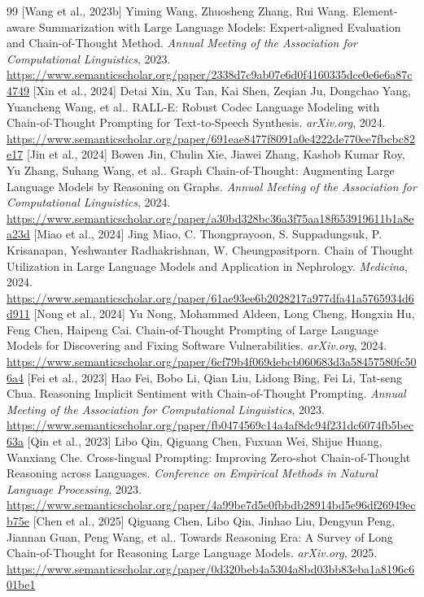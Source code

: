 \documentclass[11pt]{article}
\begin{document}
\begin{thebibliography}{99}
 [Wang et al., 2023b] Yiming Wang, Zhuosheng Zhang, Rui Wang. Element-aware Summarization with Large Language Models: Expert-aligned Evaluation and Chain-of-Thought Method. \emph{Annual Meeting of the Association for Computational Linguistics}, 2023. \url{https://www.semanticscholar.org/paper/2338d7c9ab07e6d0f4160335dce0e6e6a87c4749}
 [Xin et al., 2024] Detai Xin, Xu Tan, Kai Shen, Zeqian Ju, Dongchao Yang, Yuancheng Wang, et al.. RALL-E: Robust Codec Language Modeling with Chain-of-Thought Prompting for Text-to-Speech Synthesis. \emph{arXiv.org}, 2024. \url{https://www.semanticscholar.org/paper/691eae8477f8091a0e4222de770ee7fbcbc82e17}
 [Jin et al., 2024] Bowen Jin, Chulin Xie, Jiawei Zhang, Kashob Kumar Roy, Yu Zhang, Suhang Wang, et al.. Graph Chain-of-Thought: Augmenting Large Language Models by Reasoning on Graphs. \emph{Annual Meeting of the Association for Computational Linguistics}, 2024. \url{https://www.semanticscholar.org/paper/a30bd328bc36a3f75aa18f653919611b1a8ea23d}
 [Miao et al., 2024] Jing Miao, C. Thongprayoon, S. Suppadungsuk, P. Krisanapan, Yeshwanter Radhakrishnan, W. Cheungpasitporn. Chain of Thought Utilization in Large Language Models and Application in Nephrology. \emph{Medicina}, 2024. \url{https://www.semanticscholar.org/paper/61ae93ee6b2028217a977dfa41a5765934d6d911}
 [Nong et al., 2024] Yu Nong, Mohammed Aldeen, Long Cheng, Hongxin Hu, Feng Chen, Haipeng Cai. Chain-of-Thought Prompting of Large Language Models for Discovering and Fixing Software Vulnerabilities. \emph{arXiv.org}, 2024. \url{https://www.semanticscholar.org/paper/6cf79b4f069debcb060683d3a58457580fc506a4}
 [Fei et al., 2023] Hao Fei, Bobo Li, Qian Liu, Lidong Bing, Fei Li, Tat-seng Chua. Reasoning Implicit Sentiment with Chain-of-Thought Prompting. \emph{Annual Meeting of the Association for Computational Linguistics}, 2023. \url{https://www.semanticscholar.org/paper/fb0474569c14a4af8dc94f231dc6074fb5bec63a}
 [Qin et al., 2023] Libo Qin, Qiguang Chen, Fuxuan Wei, Shijue Huang, Wanxiang Che. Cross-lingual Prompting: Improving Zero-shot Chain-of-Thought Reasoning across Languages. \emph{Conference on Empirical Methods in Natural Language Processing}, 2023. \url{https://www.semanticscholar.org/paper/4a99be7d5e0fbbdb28914bd5e96df26949ecb75e}
 [Chen et al., 2025] Qiguang Chen, Libo Qin, Jinhao Liu, Dengyun Peng, Jiannan Guan, Peng Wang, et al.. Towards Reasoning Era: A Survey of Long Chain-of-Thought for Reasoning Large Language Models. \emph{arXiv.org}, 2025. \url{https://www.semanticscholar.org/paper/0d320beb4a5304a8bd03bb83eba1a8196c601be1}

\end{thebibliography}
\end{document}
